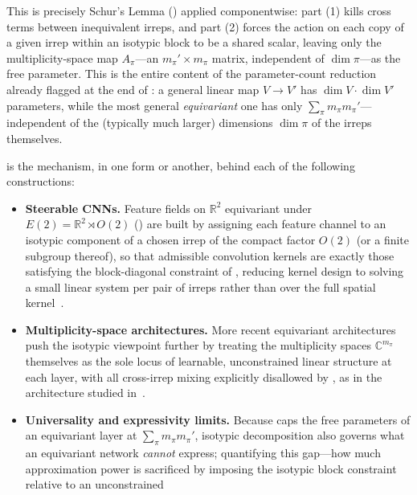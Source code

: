 \documentclass[mathematics,review,submit,moreauthors]{Definitions/mdpi}
\begin{document}
This is precisely Schur's Lemma () applied
componentwise: part (1) kills cross terms between inequivalent irreps, and
part (2) forces the action on each copy of a given irrep within an isotypic
block to be a shared scalar, leaving only the multiplicity-space map
$A_\pi$---an $m_\pi' \times m_\pi$ matrix, independent of $\dim \pi$---as the
free parameter. This is the entire content of the parameter-count reduction
already flagged at the end of : a general
linear map $V \to V'$ has $\dim V \cdot \dim V'$ parameters, while the most
general \emph{equivariant} one has only
$\sum_\pi m_\pi m_\pi'$---independent of the (typically much larger)
dimensions $\dim \pi$ of the irreps themselves.

\begin{Example}
\label{ex:isotypic-architecture}
 is the mechanism, in one form or
another, behind each of the following constructions:
\begin{itemize}
    \item \textbf{Steerable CNNs.} Feature fields on $\mathbb{R}^2$
    equivariant under $E(2) = \mathbb{R}^2 \rtimes O(2)$
    () are built by assigning each
    feature channel to an isotypic component of a chosen irrep of the
    compact factor $O(2)$ (or a finite subgroup thereof), so that admissible
    convolution kernels are exactly those satisfying the block-diagonal
    constraint of , reducing kernel
    design to solving a small linear system per pair of irreps rather than
    over the full spatial kernel~\citep{weiler2019anips}.
    \item \textbf{Multiplicity-space architectures.} More recent
    equivariant architectures push the isotypic viewpoint further by
    treating the multiplicity spaces $\mathbb{C}^{m_\pi}$ themselves as the
    sole locus of learnable, unconstrained linear structure at each layer,
    with all cross-irrep mixing explicitly disallowed by
    , as in the architecture studied
    in~\citep{xu2022p3icml}.
    \item \textbf{Universality and expressivity limits.} Because
     caps the free parameters of an
    equivariant layer at $\sum_\pi m_\pi m_\pi'$, isotypic decomposition
    also governs what an equivariant network \emph{cannot} express;
    quantifying this gap---how much approximation power is sacrificed by
    imposing the isotypic block constraint relative to an unconstrained

\end{itemize}
\end{Example}
\end{document}
